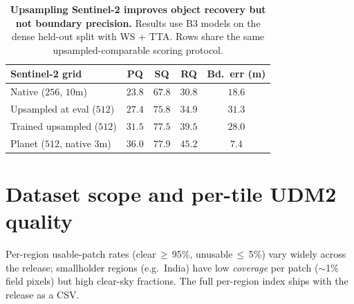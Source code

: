 \documentclass[10pt,twocolumn,letterpaper]{article}
\begin{document}
\begin{table}[h]
    \centering
    \small
    \setlength{\tabcolsep}{5pt}
    \caption{\textbf{Upsampling Sentinel-2 improves object recovery but not boundary precision.} Results use B3 models on the dense held-out split with WS + TTA. Rows share the same upsampled-comparable scoring protocol.}
    \label{tab:upsampled_s2_main}
    \begin{tabular}{lcccc}
    \toprule
    Sentinel-2 grid & PQ & SQ & RQ & Bd.\ err (m) \\
    \midrule
    Native ($256$, $10$m)         & $23.8$ & $67.8$ & $30.8$ & $18.6$ \\
    Upsampled at eval ($512$)     & $27.4$ & $75.8$ & $34.9$ & $31.3$ \\
    Trained upsampled ($512$)     & $31.5$ & $77.5$ & $39.5$ & $28.0$ \\
    \midrule
    Planet ($512$, native $3$m)   & $\mathbf{36.0}$ & $\mathbf{77.9}$ & $\mathbf{45.2}$ & $\mathbf{7.4}$ \\
    \bottomrule
    \end{tabular}
\end{table}

\section{Dataset scope and per-tile UDM2 quality}
\label{app:scope}
\label{app:udm2_country}

Per-region usable-patch rates (clear$\,\ge\,$95\%, unusable$\,\le\,$5\%) vary widely across the release; smallholder regions (e.g.\ India) have low \emph{coverage} per patch ($\sim$1\% field pixels) but high clear-sky fractions. The full per-region index ships with the release as a CSV.
\end{document}
